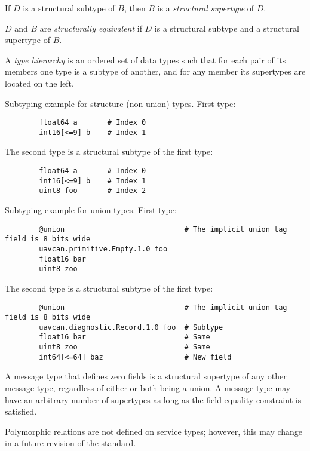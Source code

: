If $D$ is a structural subtype of $B$, then $B$ is a \emph{structural supertype} of $D$.

$D$ and $B$ are \emph{structurally equivalent} if $D$ is a structural subtype and a structural supertype of $B$.

A \emph{type hierarchy} is an ordered set of data types such that for each pair of its members
one type is a subtype of another, and for any member its supertypes are located on the left.

\begin{remark}
    Subtyping example for structure (non-union) types. First type:

    \begin{verbatim}
        float64 a       # Index 0
        int16[<=9] b    # Index 1
    \end{verbatim}

    The second type is a structural subtype of the first type:

    \begin{verbatim}
        float64 a       # Index 0
        int16[<=9] b    # Index 1
        uint8 foo       # Index 2
    \end{verbatim}

    Subtyping example for union types. First type:

    \begin{verbatim}
        @union                            # The implicit union tag field is 8 bits wide
        uavcan.primitive.Empty.1.0 foo
        float16 bar
        uint8 zoo
    \end{verbatim}

    The second type is a structural subtype of the first type:

    \begin{verbatim}
        @union                            # The implicit union tag field is 8 bits wide
        uavcan.diagnostic.Record.1.0 foo  # Subtype
        float16 bar                       # Same
        uint8 zoo                         # Same
        int64[<=64] baz                   # New field
    \end{verbatim}

    A message type that defines zero fields is a structural supertype of any other message type, regardless of either
    or both being a union.
    A message type may have an arbitrary number of supertypes as long as the field equality constraint is satisfied.

    Polymorphic relations are not defined on service types;
    however, this may change in a future revision of the standard.
\end{remark}

